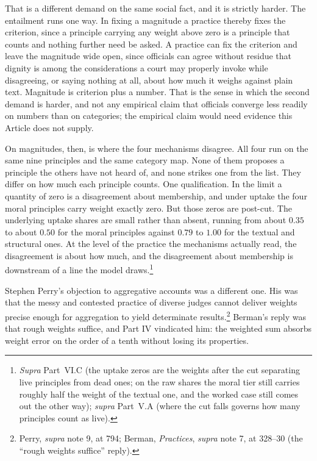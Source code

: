 That is a different demand on the same social fact, and it is strictly harder.
The entailment runs one way. In fixing a magnitude a practice thereby fixes the criterion, since a
principle carrying any weight above zero is a principle that counts and
nothing further need be asked. A practice can fix the criterion and leave the
magnitude wide open, since officials can agree without residue that
dignity is among the considerations a court may properly invoke while
disagreeing, or saying nothing at all, about how much it weighs against
plain text. Magnitude is criterion plus a number. That is the sense in
which the second demand is harder, and not any empirical claim that
officials converge less readily on numbers than on categories; the
empirical claim would need evidence this Article does not supply.

On magnitudes, then, is where the four mechanisms disagree. All four run on the same nine principles and the same category map. None of them proposes a
principle the others have not heard of, and none strikes one from the list.
They differ on how much each principle counts. One
qualification. In the limit a quantity of zero is a disagreement about
membership, and under uptake the four moral principles carry weight
exactly zero. But those zeros are post-cut. The underlying uptake shares are small rather than absent, running from
about $0.35$ to about $0.50$ for the moral
principles against $0.79$ to $1.00$ for the textual and structural ones. At the level of the practice the mechanisms actually
read, the disagreement is about how much, and the disagreement about
membership is downstream of a line the model draws.\footnote{\textit{Supra}
Part~VI.C (the uptake zeros are the weights after the cut separating live
principles from dead ones; on the raw shares the moral tier still carries roughly half the weight of the
textual one, and the worked case
still comes out the other way); \textit{supra} Part~V.A (where the cut
falls governs how many principles count as live).}

Stephen Perry's objection to aggregative accounts was a different one. His
was that the messy and contested practice of diverse judges cannot deliver
weights precise enough for aggregation to yield determinate results.\footnote{Perry, \textit{supra} note 9, at 794; Berman,
\textit{Practices}, \textit{supra} note 7, at 328--30 (the ``rough
weights suffice'' reply).} Berman's reply was that rough weights suffice, and Part IV vindicated him:
the weighted sum absorbs weight error on the order of a tenth without
losing its properties. 

